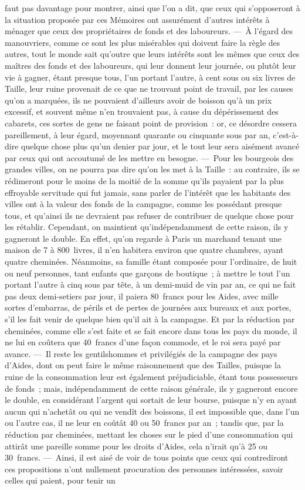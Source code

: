 \documentclass[french,twoside]{book} %
\begin{document}
faut pas davantage pour montrer, ainsi que l’on a dit, que ceux qui s’opposeront à la situation proposée par ces Mémoires ont assurément d’autres intérêts à ménager que ceux des propriétaires de fonds et des laboureurs. — À l’égard des manouvriers, comme ce sont les plus misérables qui doivent faire la règle des autres, tout le monde sait qu’outre que leurs intérêts sont les mêmes que ceux des maîtres des fonds et des laboureurs, qui leur donnent leur journée, ou plutôt leur vie à gagner, étant presque tous, l’un portant l’autre, à cent sous ou six livres de Taille, leur ruine provenait de ce que ne trouvant point de travail, par les causes qu’on a marquées, ils ne pouvaient d’ailleurs avoir de boisson qu’à un prix excessif, et souvent même n’en trouvaient pas, à cause du dépérissement des cabarets, ces sortes de gens ne faisant point de provision : or, ce désordre cessera pareillement, à leur égard, moyennant quarante ou cinquante sous par an, c’est-à-dire quelque chose plus qu’un denier par jour, et le tout leur sera aisément avancé par ceux qui ont accoutumé de les mettre en besogne. — Pour les bourgeois des grandes villes, on ne pourra pas dire qu’on les met à la Taille : au contraire, ils se rédimeront pour le moins de la moitié de la somme qu’ils payaient par la plus effroyable servitude qui fut jamais, sans parler de l’intérêt que les habitants des villes ont à la valeur des fonds de la campagne, comme les possédant presque tous, et qu’ainsi ils ne devraient pas refuser de contribuer de quelque chose pour les rétablir. Cependant, on maintient qu’indépendamment de cette raison, ils y gagneront le double. En effet, qu’on regarde à Paris un marchand tenant une maison de 7 à 800 livres, il n’en habitera environ que quatre chambres, ayant quatre cheminées. Néanmoins, sa famille étant composée pour l’ordinaire, de huit ou neuf personnes, tant enfants que garçons de boutique ; à mettre le tout l’un portant l’autre à cinq sous par tête, à un demi-muid de vin par an, ce qui ne fait pas deux demi-setiers par jour, il paiera 80 francs pour les Aides, avec mille sortes d’embarras, de périls et de pertes de journées aux bureaux et aux portes, s’il les fait venir de quelque bien qu’il ait à la campagne. Et par la réduction par cheminées, comme elle s’est faite et se fait encore dans tous les pays du monde, il ne lui en coûtera que 40 francs d’une façon commode, et le roi sera payé par avance. — Il reste les gentilshommes et privilégiés de la campagne des pays d’Aides, dont on peut faire le même raisonnement que des Tailles, puisque la ruine de la consommation leur est également préjudiciable, étant tous possesseurs de fonds ; mais, indépendamment de cette raison générale, ils y gagneront encore le double, en considérant l’argent qui sortait de leur bourse, puisque n’y en ayant aucun qui n’achetât ou qui ne vendît des boissons, il est impossible que, dans l’un ou l’autre cas, il ne leur en coûtât 40 ou 50 francs par an ; tandis que, par la réduction par cheminées, mettant les choses sur le pied d’une consommation qui attirât une pareille somme pour les droits d’Aides, cela n’irait qu’à 25 ou 30 francs. — Ainsi, il est aisé de voir de tous points que ceux qui contrediront ces propositions n’ont nullement procuration des personnes intéressées, savoir celles qui paient, pour tenir un 
\end{document}
